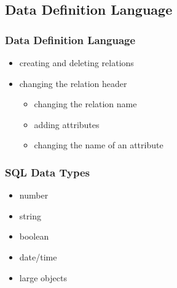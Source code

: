 \documentclass[dvipsnames]{beamer}
\theoremstyle{plain}
\begin{document}
\subsection{Data Definition Language}

\begin{frame}
  \frametitle{Data Definition Language}

  \begin{itemize}
    \item creating and deleting relations

    \pause
    \item changing the relation header
    \begin{itemize}
      \item changing the relation name
      \item adding attributes
      \item changing the name of an attribute
    \end{itemize}
  \end{itemize}
\end{frame}

\begin{frame}
  \frametitle{SQL Data Types}

  \begin{itemize}
    \item number
    \item string
    \item boolean
    \item date/time
    \item large objects
  \end{itemize}
\end{frame}
\end{document}
